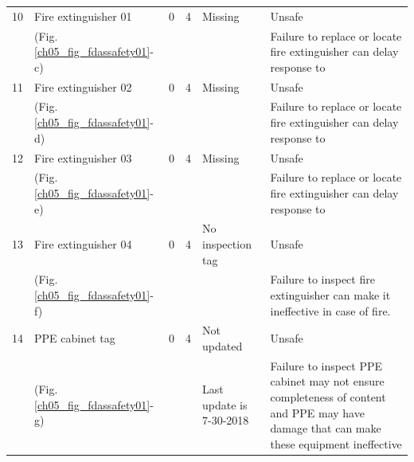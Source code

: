 \begin{table}[!htb]
{\begin{tabular}{c|l|c|c|p{3cm}|p{5cm}}
	\hline
	10 & Fire extinguisher 01 & 0 & 4 & Missing & Unsafe \\ 
	& (Fig. \ref{ch05_fig_fdassafety01}-c) &  &  &  & Failure to replace or locate fire extinguisher can delay response to  \\ 
	\hline
	11 & Fire extinguisher 02 & 0 & 4 & Missing & Unsafe \\ 
	& (Fig. \ref{ch05_fig_fdassafety01}-d) &  &  &  & Failure to replace or locate fire extinguisher can delay response to  \\ 
	\hline
	12 & Fire extinguisher 03 & 0 & 4 & Missing & Unsafe \\ 
	& (Fig. \ref{ch05_fig_fdassafety01}-e) &  &  &  & Failure to replace or locate fire extinguisher can delay response to  \\ 
	\hline
	13 & Fire extinguisher 04 & 0 & 4 & No inspection tag & Unsafe \\ 
	& (Fig. \ref{ch05_fig_fdassafety01}-f) &  &  &  & Failure to inspect fire extinguisher can make it ineffective in case of fire. \\ 
	\hline
	14 & PPE cabinet tag & 0 & 4 & Not updated & Unsafe \\ 
	& (Fig. \ref{ch05_fig_fdassafety01}-g) &  &  & Last update is 7-30-2018 & Failure to inspect PPE cabinet may not ensure completeness of content and PPE may have damage that can make these equipment ineffective  \\ 
	\hline
\end{tabular}
}
\end{table}


